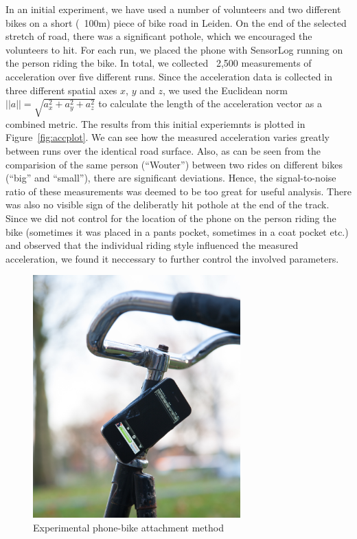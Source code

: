 \documentclass[a4paper,11pt]{article}
\begin{document}
In an initial experiment, we have used a number of volunteers and two different bikes on a short (~100m) piece of bike road in Leiden. On the end of the selected stretch of road, there was a significant pothole, which we encouraged the volunteers to hit. For each run, we placed the phone with SensorLog running on the person riding the bike. In total, we collected ~2,500 measurements of acceleration over five different runs. Since the acceleration data is collected in three different spatial axes $x$, $y$ and $z$, we used the Euclidean norm $||a|| = \sqrt{a_x^2+a_y^2+a_z^2}$ to calculate the length of the acceleration vector as a combined metric. The results from this initial experiemnts is plotted in Figure~\ref{fig:accplot}. We can see how the measured acceleration varies greatly between runs over the identical road surface. Also, as can be seen from the comparision of the same person (``Wouter'') between two rides on different bikes (``big'' and ``small''), there are significant deviations. Hence, the signal-to-noise ratio of these measurements was deemed to be too great for useful analysis. There was also no visible sign of the deliberatly hit pothole at the end of the track. Since we did not control for the location of the phone on the person riding the bike (sometimes it was placed in a pants pocket, sometimes in a coat pocket etc.) and observed that the individual riding style influenced the measured acceleration, we found it neccessary to further control the involved parameters.


\begin{figure}
\centering
\includegraphics[width=8cm]{figures/bikec}
\caption{Experimental phone-bike attachment method}
\label{fig:exsetup}
\end{figure}
\end{document}
